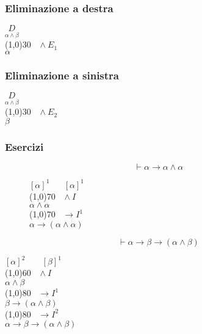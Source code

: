 \documentclass{article}
\theoremstyle{break}
\theoremstyle{break}
\theoremstyle{break}
\theoremstyle{break}
\begin{document}
\subsubsection{Eliminazione a destra}
\begin{center}
  \(
  \underset{\alpha \wedge \beta}{D}
  \)\\ 
  \hspace{1cm}\line(1,0){30}\(\;\;\; \wedge E_1 \)\\  
  \(
  \alpha
  \)
\end{center}

\subsubsection{Eliminazione a sinistra}
\begin{center}
  \(
  \underset{\alpha \wedge \beta}{D}
  \)\\ 
  \hspace{1cm}\line(1,0){30}\(\;\;\; \wedge E_2 \)\\  
  \(
  \beta
  \)
\end{center}

\subsubsection{Esercizi}

\begin{figure}[H]
  \begin{exercise}
    \[
      \vdash \alpha \to \alpha \wedge \alpha
    \] 
    \begin{center}
      \(
      [\alpha]^1 \;\;\;\;\;\; [\alpha]^1
      \)\\ 
      \hspace{0.8cm}\line(1,0){70}\(\;\;\; \wedge I \)\\
      \(
      \alpha \wedge \alpha
      \)\\
      \hspace{1.2cm}\line(1,0){70}\(\;\;\; \to I^1 \)\\
      \( \alpha \to (\alpha \wedge \alpha) \) 
    \end{center}
  \end{exercise}
\end{figure}

\begin{exercise}
  \[
    \vdash \alpha \to \beta \to (\alpha \wedge \beta)
  \] 
  \begin{center}
    \( [\alpha]^2\;\;\;\;\;\;\; [\beta]^1 \) \\
    \hspace{0.6cm}\line(1,0){60}\(\;\;\; \wedge I \)\\
    \( \alpha \wedge \beta \) \\
    \hspace{1cm}\line(1,0){80}\(\;\;\; \to I^1 \)\\
    \( \beta \to (\alpha \wedge \beta) \) \\
    \hspace{1cm}\line(1,0){80}\(\;\;\; \to I^2 \)\\
    \( \alpha \to  \beta \to  (\alpha \wedge \beta) \) 
  \end{center}
\end{exercise}
\end{document}
